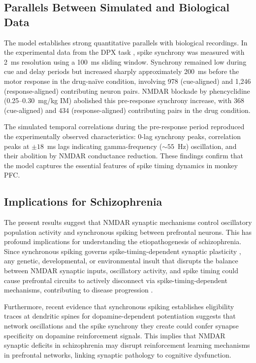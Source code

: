 \documentclass[12pt]{article}
\begin{document}
\subsection{Parallels Between Simulated and Biological Data}

The model establishes strong quantitative parallels with biological recordings. In the experimental data from the DPX task \citep{Zick2018}, spike synchrony was measured with 2~ms resolution using a 100~ms sliding window. Synchrony remained low during cue and delay periods but increased sharply approximately 200~ms before the motor response in the drug-na\"ive condition, involving 978 (cue-aligned) and 1{,}246 (response-aligned) contributing neuron pairs. NMDAR blockade by phencyclidine (0.25--0.30~mg/kg IM) abolished this pre-response synchrony increase, with 368 (cue-aligned) and 434 (response-aligned) contributing pairs in the drug condition.

The simulated temporal correlations during the pre-response period reproduced the experimentally observed characteristics: 0-lag synchrony peaks, correlation peaks at $\pm 18$~ms lags indicating gamma-frequency (${\sim}55$~Hz) oscillation, and their abolition by NMDAR conductance reduction. These findings confirm that the model captures the essential features of spike timing dynamics in monkey PFC.

\subsection{Implications for Schizophrenia}

The present results suggest that NMDAR synaptic mechanisms control oscillatory population activity and synchronous spiking between prefrontal neurons. This has profound implications for understanding the etiopathogenesis of schizophrenia. Since synchronous spiking governs spike-timing-dependent synaptic plasticity \citep{DanPoo2004}, any genetic, developmental, or environmental insult that disrupts the balance between NMDAR synaptic inputs, oscillatory activity, and spike timing could cause prefrontal circuits to actively disconnect via spike-timing-dependent mechanisms, contributing to disease progression \citep{Zick2021, Zick2018}.

Furthermore, recent evidence that synchronous spiking establishes eligibility traces at dendritic spines for dopamine-dependent potentiation \citep{He2015, Kasai2021, Yagishita2014} suggests that network oscillations and the spike synchrony they create could confer synapse specificity on dopamine reinforcement signals. This implies that NMDAR synaptic deficits in schizophrenia may disrupt reinforcement learning mechanisms in prefrontal networks, linking synaptic pathology to cognitive dysfunction.
\end{document}
